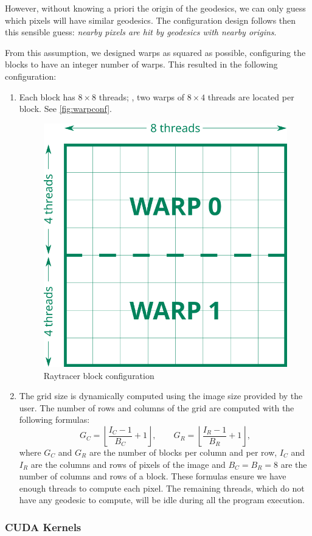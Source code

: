 However, without knowing a priori the origin of the geodesics, we can only guess which pixels will have similar geodesics. The configuration design follows then this sensible guess: \emph{nearby pixels are hit by geodesics with nearby origins}.

From this assumption, we designed warps as squared as possible, configuring the blocks to have an integer number of warps. This resulted in the following configuration:
\begin{enumerate}
	\item Each block has $8\times8$ threads; \ie, two warps of $8\times4$ threads are located per block. See \autoref{fig:warpconf}.
	\begin{figure}[bth]
		\myfloatalign
		\includegraphics[width=.5\linewidth]{gfx/warpconf.png}
		\caption[Raytracer block configuration]{Raytracer block configuration}
		\label{fig:warpconf}
	\end{figure}
	\item The grid size is dynamically computed using the image size provided by the user. The number of rows and columns of the grid are computed with the following formulas:
	\begin{equation*}
	G_C = \left \lfloor{\frac{I_C - 1}{B_C} + 1}\right \rfloor, \qquad
	G_R = \left \lfloor{\frac{I_R - 1}{B_R} + 1}\right \rfloor,
	\end{equation*}
	where $G_C$ and $G_R$ are the number of blocks per column and per row, $I_C$ and $I_R$ are the columns and rows of pixels of the image and $B_C = B_R = 8$ are the number of columns and rows of a block. These formulas ensure we have enough threads to compute each pixel. The remaining threads, which do not have any geodesic to compute, will be idle during all the program execution.
\end{enumerate}

\subsubsection*{CUDA Kernels}

